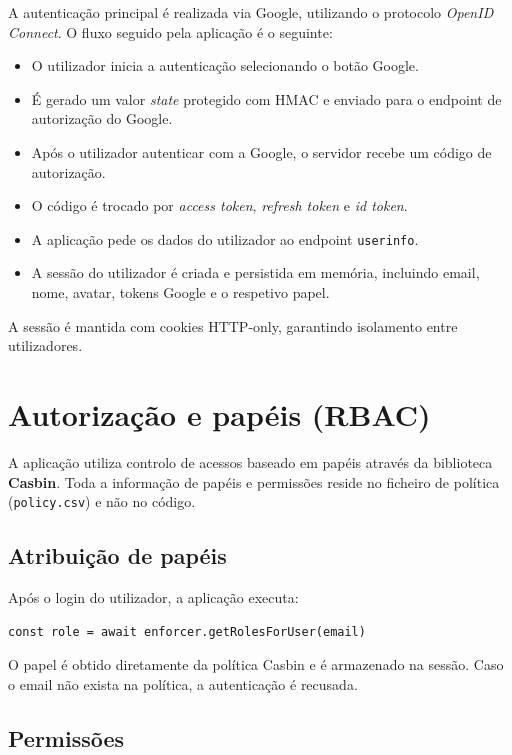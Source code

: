 A autenticação principal é realizada via Google, utilizando o protocolo \textit{OpenID Connect}. O fluxo seguido pela aplicação é o seguinte:

\begin{itemize}
    \item O utilizador inicia a autenticação selecionando o botão Google.
    \item É gerado um valor \textit{state} protegido com HMAC e enviado para o endpoint de autorização do Google.
    \item Após o utilizador autenticar com a Google, o servidor recebe um código de autorização.
    \item O código é trocado por \textit{access token}, \textit{refresh token} e \textit{id token}.
    \item A aplicação pede os dados do utilizador ao endpoint \texttt{userinfo}.
    \item A sessão do utilizador é criada e persistida em memória, incluindo email, nome, avatar, tokens Google e o respetivo papel.
\end{itemize}

A sessão é mantida com cookies HTTP-only, garantindo isolamento entre utilizadores.

\section{Autorização e papéis (RBAC)}

A aplicação utiliza controlo de acessos baseado em papéis através da biblioteca \textbf{Casbin}.  
Toda a informação de papéis e permissões reside no ficheiro de política (\texttt{policy.csv}) e não no código.

\subsection{Atribuição de papéis}

Após o login do utilizador, a aplicação executa:

\begin{verbatim}
const role = await enforcer.getRolesForUser(email)
\end{verbatim}

O papel é obtido diretamente da política Casbin e é armazenado na sessão.  
Caso o email não exista na política, a autenticação é recusada.

\subsection{Permissões}

